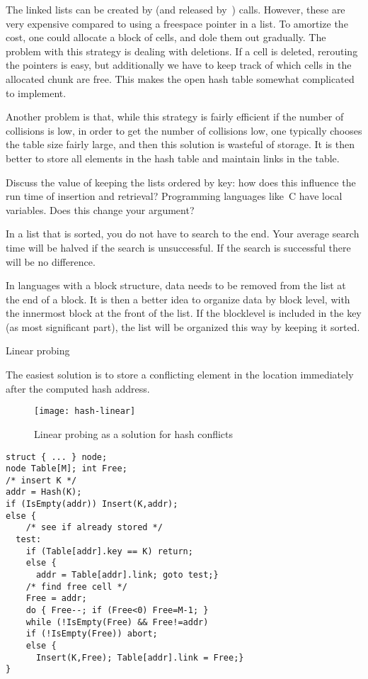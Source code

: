 The linked lists can be created by  (and released
by~) calls. However, these are very expensive compared to
using a freespace pointer in a list. To amortize the cost, one could
allocate a block of cells, and dole them out gradually. The problem
with this strategy is dealing with deletions. If a cell is deleted,
rerouting the pointers is easy, but additionally we have to keep track
of which cells in the allocated chunk are free. This makes the open
hash table somewhat complicated to implement.

Another problem is that, while this strategy is fairly efficient if
the number of collisions is low, in order to get the number of
collisions low, one typically chooses the table size fairly large, and
then this solution is wasteful of storage. It is then better to store
all elements in the hash table and maintain links in the table.
\begin{594exercise}
Discuss the value of keeping the lists ordered by key: how does this
influence the run time of insertion and retrieval? Programming
languages like~C have local variables. Does this change your argument?
\end{594exercise}
\begin{answer}
In a list that is sorted, you do not have to search to the end. Your
average search time will be halved if the search is unsuccessful. If
the search is successful there will be no difference.

In languages with a block structure, data needs to be removed from the
list at the end of a block. It is then a better idea to organize data
by block level, with the innermost block at the front of the list. If
the blocklevel is included in the key (as most significant part), the
list will be organized this way by keeping it sorted.
\end{answer}

 {Linear probing}

The easiest solution is to store a conflicting element in the location
immediately after the computed hash address.
\begin{figure}
\texttt{[image: hash-linear]}
\caption{Linear probing as a solution for hash conflicts}
\label{fig:hash-linear}
\end{figure}
\begin{verbatim}
struct { ... } node;
node Table[M]; int Free;
/* insert K */
addr = Hash(K);
if (IsEmpty(addr)) Insert(K,addr);
else {
    /* see if already stored */
  test:
    if (Table[addr].key == K) return;
    else {
      addr = Table[addr].link; goto test;}
    /* find free cell */
    Free = addr;
    do { Free--; if (Free<0) Free=M-1; }
    while (!IsEmpty(Free) && Free!=addr)
    if (!IsEmpty(Free)) abort;
    else {
      Insert(K,Free); Table[addr].link = Free;}
}
\end{verbatim}

